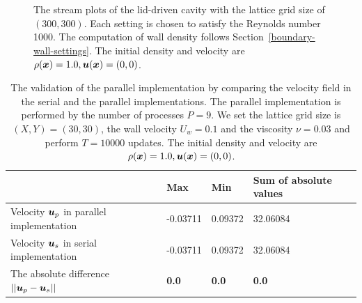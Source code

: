 \begin{figure}[t]
  \begin{center}
    \\
    \vspace{-3mm}
    \\
    \caption{The stream plots of the lid-driven cavity
    with the lattice grid size of $(300, 300)$.
    Each setting is chosen to satisfy the Reynolds number 1000.
    The computation of wall density follows Section~\ref{boundary-wall-settings}.
    The initial density and velocity are $\rho(\boldsymbol{x}) = 1.0, \boldsymbol{u}(\boldsymbol{x}) = (0, 0)$.
      \label{fig:sliding-lid-velocity-evolution}}
  \end{center}
\end{figure}

\begin{table}
  \begin{center}
    \caption{The validation of the parallel implementation by comparing
    the velocity field in the serial and the parallel implementations.
    The parallel implementation is performed by the number of processes $P = 9$.
    We set the lattice grid size is $(X, Y) = (30, 30)$,
    the wall velocity $U_w = 0.1$ and the viscosity $\nu = 0.03$
    and perform $T = 10000$ updates.
    The initial density and velocity are $\rho(\boldsymbol{x}) = 1.0, \boldsymbol{u}(\boldsymbol{x}) = (0, 0)$.
    }
    \vspace{2mm}
    \label{tab:parallel-validation}
    \begin{tabular}{llll}
      \toprule
       & Max & Min & Sum of absolute values \\
      \midrule
      Velocity $\boldsymbol{u}_p$ in parallel implementation & -0.03711 & 0.09372 & 32.06084 \\
      Velocity $\boldsymbol{u}_s$ in serial implementation & -0.03711 & 0.09372 & 32.06084 \\
      The absolute difference $|| \boldsymbol{u}_p - \boldsymbol{u}_s ||$ & {\bf 0.0} & {\bf 0.0} & {\bf 0.0} \\
      \bottomrule
    \end{tabular}
  \end{center}
  \vspace{-5mm}
\end{table}

